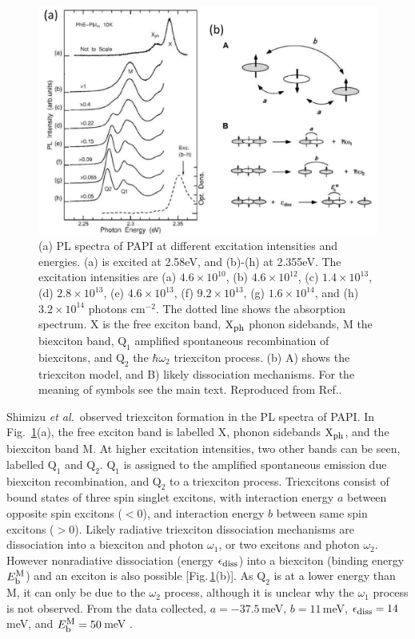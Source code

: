 \begin{figure}[h!]
\centering
\includegraphics[width=\textwidth]{Fig16}
\caption{(a) PL spectra of PAPI at different excitation intensities and energies. (a) is excited at 2.58eV, and (b)-(h) at 2.355eV. The excitation intensities are (a) $4.6\times 10^{10}$, (b) $4.6\times 10^{12}$, (c) $1.4\times 10^{13}$, (d) $2.8\times 10^{13}$, (e) $4.6\times 10^{13}$, (f) $9.2\times 10^{13}$, (g) $1.6\times 10^{14}$, and (h) $3.2\times 10^{14}$ photons c$\textrm{m}^{-2}$. The dotted line shows the absorption spectrum. X is the free exciton band, $\textrm{X}_{\textrm{\footnotesize ph}}$ phonon sidebands, M the biexciton band, $\textrm{Q}_1$ amplified spontaneous recombination of biexcitons, and $\textrm{Q}_2$ the $\hbar \omega_2$ triexciton process. (b) A) shows the triexciton model, and B) likely dissociation mechanisms. For the meaning of symbols see the main text. Reproduced from Ref.\cite{Shimizu2006a}.}
\label{2Fig16}
\end{figure}

Shimizu \textit{et al.}\ observed triexciton formation in the PL spectra of PAPI. In Fig.\ \ref{2Fig16}(a), the free exciton band is labelled X, phonon sidebands $\textrm{X}_{\textrm{\footnotesize ph}}$, and the biexciton band M. At higher excitation intensities, two other bands can be seen, labelled $\textrm{Q}_1$ and $\textrm{Q}_2$. $\textrm{Q}_1$ is assigned to the amplified spontaneous emission due biexciton recombination, and $\textrm{Q}_2$ to a triexciton process. Triexcitons consist of bound states of three spin singlet excitons, with interaction energy $a$ between opposite spin excitons ($<0$), and interaction energy $b$ between same spin excitons ($>0$). Likely radiative triexciton dissociation mechanisms are dissociation into a biexciton and photon $\omega_1$, or two excitons and photon $\omega_2$. However nonradiative dissociation (energy $\epsilon_{\textrm{\footnotesize diss}}$) into a biexciton (binding energy $E_{\textrm{\footnotesize b}}^{\textrm{\footnotesize M}}$) and an exciton is also possible [Fig.\,\ref{2Fig16}(b)]. As $\textrm{Q}_2$ is at a lower energy than M, it can only be due to the $\omega_2$ process, although it is unclear why the $\omega_1$ process is not observed. From the data collected, $a=-37.5$\,meV, $b=11$\,meV, $\epsilon_{\textrm{\footnotesize diss}}=14$\,meV, and $E_{\textrm{\footnotesize b}}^{\textrm{\footnotesize M}}=50$\,meV \cite{Shimizu2006a}. 


